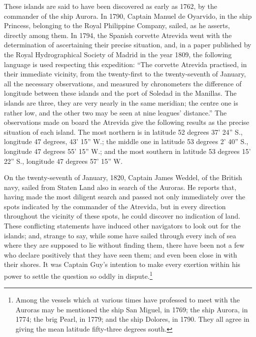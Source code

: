 These islands are said to have been discovered as early as 1762, by the
commander of the ship Aurora. In 1790, Captain Manuel de Oyarvido, in the ship
Princess, belonging to the Royal Philippine Company, sailed, as he asserts,
directly among them. In 1794, the Spanish corvette Atrevida went with the
determination of ascertaining their precise situation, and, in a paper published
by the Royal Hydrographical Society of Madrid in the year 1809, the following
language is used respecting this expedition: ``The corvette Atrevida practised,
in their immediate vicinity, from the twenty-first to the twenty-seventh of
January, all the necessary observations, and measured by chronometers the
difference of longitude between these islands and the port of Soledad in the
Manillas. The islands are three, they are very nearly in the same meridian; the
centre one is rather low, and the other two may be seen at nine leagues'
distance.'' The observations made on board the Atrevida give the following
results as the precise situation of each island. The most northern is in
latitude 52 degrees 37' 24'' S., longitude 47 degrees, 43' 15'' W.; the middle one
in latitude 53 degrees 2' 40'' S., longitude 47 degrees 55' 15'' W.; and the most
southern in latitude 53 degrees 15' 22'' S., longitude 47 degrees 57' 15'' W. 

On the twenty-seventh of January, 1820, Captain James Weddel, of the British
navy, sailed from Staten Land also in search of the Auroras. He reports that,
having made the most diligent search and passed not only immediately over the
spots indicated by the commander of the Atrevida, but in every direction
throughout the vicinity of these spots, he could discover no indication of land.
These conflicting statements have induced other navigators to look out for the
islands; and, strange to say, while some have sailed through every inch of sea
where they are supposed to lie without finding them, there have been not a few
who declare positively that they have seen them; and even been close in with
their shores. It was Captain Guy's intention to make every exertion within his
power to settle the question so oddly in dispute.\footnote{Among the
vessels which at various times have professed to meet with the Auroras may be
mentioned the ship San Miguel, in 1769; the ship Aurora, in 1774; the brig
Pearl, in 1779; and the ship Dolores, in 1790. They all agree in giving the mean
latitude fifty-three degrees south.}

